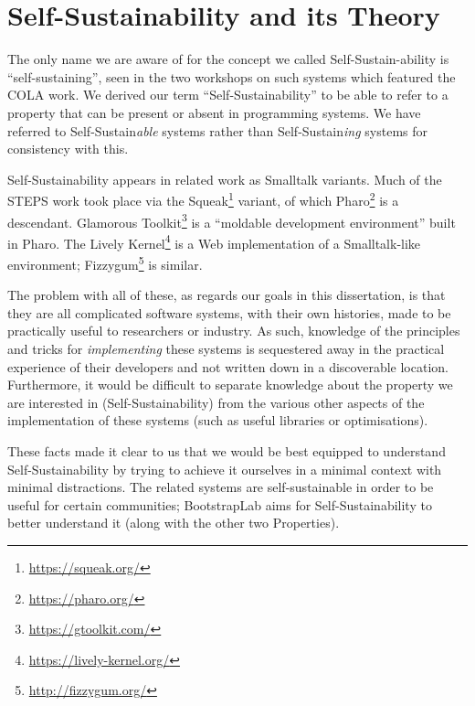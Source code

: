 \documentclass[ twoside,openright,titlepage,numbers=noenddot,headinclude,footinclude,cleardoublepage=empty,abstract=on,
                BCOR=5mm,paper=a4,fontsize=11pt
                ]{scrreprt}
\theoremstyle{definition}
\begin{document}
\hypertarget{self-sustainability-and-its-theory}{\section{Self-Sustainability and its
Theory}\label{self-sustainability-and-its-theory}}

The only name we are aware of for the concept we called
Self-Sustain-ability is ``self-sustaining'', seen in the two workshops
on such systems \parencite{SSS-08,SSS-10} which featured the \ac{COLA}
work. We derived our term ``Self-Sustainability'' to be able to refer to
a property that can be present or absent in programming systems. We have
referred to Self-Sustain\emph{able} systems rather than
Self-Sustain\emph{ing} systems for consistency with this.

Self-Sustainability appears in related work as Smalltalk variants. Much
of the STEPS work took place via the Squeak\footnote{\url{https://squeak.org/}}
variant, of which Pharo\footnote{\url{https://pharo.org/}} is a
descendant. Glamorous Toolkit\footnote{\url{https://gtoolkit.com/}} is a
``moldable development environment'' built in Pharo. The Lively
Kernel\footnote{\url{https://lively-kernel.org/}} is a Web
implementation of a Smalltalk-like environment; Fizzygum\footnote{\url{http://fizzygum.org/}}
is similar.

The problem with all of these, as regards our goals in this
dissertation, is that they are all complicated software systems, with
their own histories, made to be practically useful to researchers or
industry. As such, knowledge of the principles and tricks for
\emph{implementing} these systems is sequestered away in the practical
experience of their developers and not written down in a discoverable
location. Furthermore, it would be difficult to separate knowledge about
the property we are interested in (Self-Sustainability) from the various
other aspects of the implementation of these systems (such as useful
libraries or optimisations).

These facts made it clear to us that we would be best equipped to
understand Self-Sustainability by trying to achieve it ourselves in a
minimal context with minimal distractions. The related systems are
self-sustainable in order to be useful for certain communities;
BootstrapLab aims for Self-Sustainability to better understand it (along
with the other two Properties).
\end{document}
